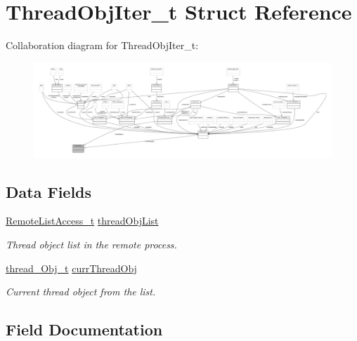 \hypertarget{struct_thread_obj_iter__t}{}\section{Thread\+Obj\+Iter\+\_\+t Struct Reference}
\label{struct_thread_obj_iter__t}


Collaboration diagram for Thread\+Obj\+Iter\+\_\+t\+:
\nopagebreak
\begin{figure}[H]
\begin{center}
\leavevmode
\includegraphics[width=350pt]{struct_thread_obj_iter__t__coll__graph}
\end{center}
\end{figure}
\subsection*{Data Fields}
\begin{DoxyCompactItemize}
\item 
\hyperlink{struct_remote_list_access__t}{Remote\+List\+Access\+\_\+t} \hyperlink{struct_thread_obj_iter__t_a507feff4664a9220fa632f0220d2bf05}{thread\+Obj\+List}
\begin{DoxyCompactList}\small\item\em Thread object list in the remote process. \end{DoxyCompactList}\item 
\hyperlink{structthread___obj__t}{thread\+\_\+\+Obj\+\_\+t} \hyperlink{struct_thread_obj_iter__t_a68792c586dc3308949726095f6c50ddb}{curr\+Thread\+Obj}
\begin{DoxyCompactList}\small\item\em Current thread object from the list. \end{DoxyCompactList}\end{DoxyCompactItemize}


\subsection{Field Documentation}
